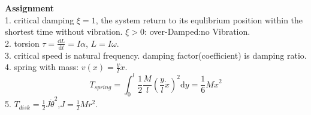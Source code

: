 \documentclass{article}
\begin{document}
\begin{multicols}{3}
  \noindent\textbf{Assignment}\\
  1. critical damping $\xi=1$, the system return to its equlibrium position within the shortest time without vibration.
  $\xi>0$: over-Damped:no Vibration.\\
  2. torsion $\tau=\frac{\text{d}L}{\text{d}t}=I\alpha$, $L=I\omega$.\\
  3. critical speed is natural frequency. damping factor(coefficient) is damping ratio.\\
  4. spring with mass: $v(x)=\frac{y}{l}\dot{x}$.
  \begin{equation*}
    T_{spring}=\int_{0}^{l}\frac{1}{2}\frac{M}{l}(\frac{y}{l}\dot{x})^{2}\text{d}y
    =\frac{1}{6}M\dot{x}^{2}
  \end{equation*}
  5. $T_{disk}=\frac{1}{2}J\dot{\theta}^{2}$,$J=\frac{1}{2}Mr^{2}$.
 \end{multicols}
\end{document}
